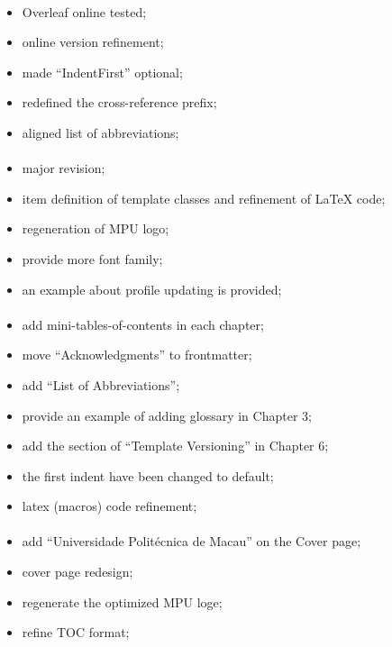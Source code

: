 \paragraph{}
	\begin{itemize}[noitemsep]
		\item Overleaf online tested;
		\item online version refinement;
		\item made ``IndentFirst'' optional;
		\item redefined the cross-reference prefix;
		\item aligned list of abbreviations;
	\end{itemize}

\paragraph{}
	\begin{itemize}[noitemsep]
		\item major revision;
		\item item definition of template classes and refinement of \LaTeX{} code;
		\item regeneration of MPU logo;
		\item provide more font family;
		\item an example about profile updating is provided;
	\end{itemize}

\paragraph{}
	\begin{itemize}[noitemsep]
		\item add mini-tables-of-contents in each chapter;
		\item move ``Acknowledgments'' to frontmatter;
		\item add ``List of Abbreviations'';
		\item provide an example of adding glossary in Chapter 3;
		\item add the section of ``Template Versioning'' in Chapter 6;
		\item the first indent have been changed to default;
		\item latex (macros) code refinement;
	\end{itemize}

\paragraph{}
	\begin{itemize}[noitemsep]
		\item add ``Universidade Polit\'{e}cnica de Macau'' on the Cover page;
		\item cover page redesign;
		\item regenerate the optimized MPU loge;
		\item refine TOC format;
	\end{itemize}

